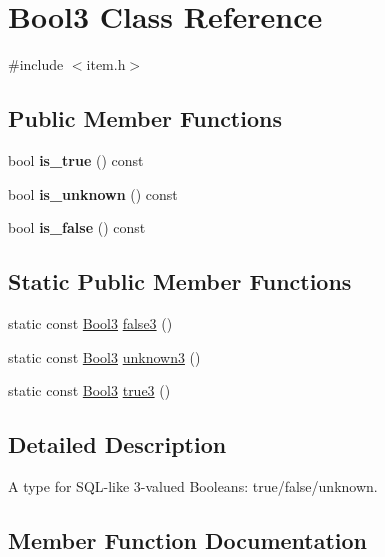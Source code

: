\hypertarget{classBool3}{}\section{Bool3 Class Reference}
\label{classBool3}


{\ttfamily \#include $<$item.\+h$>$}

\subsection*{Public Member Functions}
\begin{DoxyCompactItemize}
\item 
\mbox{\label{classBool3_aacde532983ba06c6444d2fe59f1591c3}} 
bool {\bfseries is\+\_\+true} () const
\item 
\mbox{\label{classBool3_adea39cc6b36e9cf30d0dc6e4d95cf030}} 
bool {\bfseries is\+\_\+unknown} () const
\item 
\mbox{\label{classBool3_ae98bb80d3cd8df1a0f6ed93d91fc3691}} 
bool {\bfseries is\+\_\+false} () const
\end{DoxyCompactItemize}
\subsection*{Static Public Member Functions}
\begin{DoxyCompactItemize}
\item 
static const \mbox{\hyperlink{classBool3}{Bool3}} \mbox{\hyperlink{classBool3_a8fbf4af5446cd99bd5b37a3c26c27a79}{false3}} ()
\item 
static const \mbox{\hyperlink{classBool3}{Bool3}} \mbox{\hyperlink{classBool3_a6b6cecbc55c466af91fe223e31f71995}{unknown3}} ()
\item 
static const \mbox{\hyperlink{classBool3}{Bool3}} \mbox{\hyperlink{classBool3_a4ac9552efeb411c1f93524e66028dce8}{true3}} ()
\end{DoxyCompactItemize}


\subsection{Detailed Description}
A type for S\+QL-\/like 3-\/valued Booleans\+: true/false/unknown. 

\subsection{Member Function Documentation}
\mbox{\label{classBool3_a8fbf4af5446cd99bd5b37a3c26c27a79}} 
